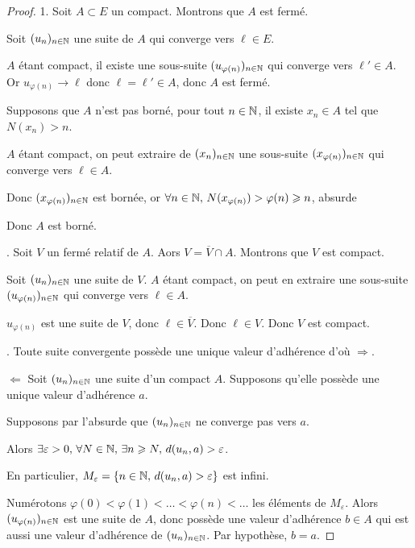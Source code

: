 \begin{proof}
    1. Soit $A \subset E$ un compact. Montrons que $A$ est fermé.

    Soit $(u_n)_{n \in \mathbb{N}}$ une suite de $A$ qui converge vers $\ell \in E$.

    $A$ étant compact, il existe une sous-suite $(u_{\varphi(n)})_{n \in \mathbb{N}}$ qui converge vers
    $\ell' \in A$. Or $u_{\varphi(n)} \to \ell$ donc $\ell = \ell' \in A$, donc $A$ est fermé.

    Supposons que $A$ n'est pas borné, pour tout $n \in \mathbb{N}$, il existe 
    $x_n \in A$ tel que $N(x_n) > n$.

    $A$ étant compact, on peut extraire de $(x_n)_{n \in \mathbb{N}}$ une sous-suite $(x_{\varphi(n)})_{n \in \mathbb{N}}$ qui converge vers $\ell \in A$.

    Donc $(x_{\varphi(n)})_{n \in \mathbb{N}}$ est bornée, or $\forall n \in \mathbb{N}, \, N(x_{\varphi(n)}) > \varphi(n) \geqslant n$, absurde 

    Donc $A$ est borné.

    . Soit $V$ un fermé relatif de $A$. Aors $V = \overline V \cap A$. Montrons 
    que $V$ est compact. 

    Soit $(u_n)_{n \in \mathbb{N}}$ une suite de $V$. $A$ étant compact, on peut en extraire 
    une sous-suite $(u_{\varphi(n)})_{n \in \mathbb{N}}$ qui converge vers $\ell \in A$.

    $u_{\varphi(n)} $ est une suite de $V$, donc $\ell \in \overline V$. Donc 
    $\ell \in V$. Donc $V$ est compact.

    . Toute suite convergente possède une unique valeur d'adhérence d'où $\Rightarrow$. 

    $\Leftarrow$ Soit $(u_n)_{n \in \mathbb{N}}$ une suite d'un compact $A$. Supposons qu'elle possède 
    une unique valeur d'adhérence $a$.

    Supposons par l'absurde que $(u_n)_{n \in \mathbb{N}}$ ne converge pas vers $a$.

    Alors $ \exists \varepsilon > 0, \, \forall N \in \mathbb{N}, \, \exists n \geqslant N, \, d(u_n, a) > \varepsilon$.

    En particulier, $M_\varepsilon = \{ n \in \mathbb{N}, \, d(u_n, a) > \varepsilon \}$ est infini. 

    Numérotons $\varphi(0) < \varphi(1) < \ldots < \varphi(n) < \ldots$ les éléments
    de $M_\varepsilon$. Alors $(u_{\varphi(n)})_{n \in \mathbb{N}}$ est une suite de $A$, donc 
    possède une valeur d'adhérence $b \in A$ qui est aussi une valeur d'adhérence de 
    $(u_n)_{n \in \mathbb{N}}$. Par hypothèse, $b = a$.


\end{proof}
